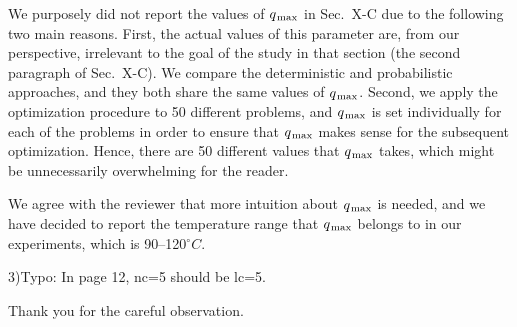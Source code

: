 \begin{authors}
We purposely did not report the values of $q_{\text{\kern0.1emmax}}$ in Sec.~X-C due to the
following two main reasons. First, the actual values of this parameter are,
from our perspective, irrelevant to the goal of the study in that section
(the second paragraph of Sec.~X-C). We compare the deterministic and
probabilistic approaches, and they both share the same values of $q_{\text{\kern0.1emmax}}$.
Second, we apply the optimization procedure to 50 different problems, and
$q_{\text{\kern0.1emmax}}$ is set individually for each of the problems in order to ensure
that $q_{\text{\kern0.1emmax}}$ makes sense for the subsequent optimization. Hence, there
are 50 different values that $q_{\text{\kern0.1emmax}}$ takes, which might be unnecessarily
overwhelming for the reader.

We agree with the reviewer that more intuition about $q_{\text{\kern0.1emmax}}$ is needed,
and we have decided to report the temperature range that $q_{\text{\kern0.1emmax}}$ belongs
to in our experiments, which is 90--120${}^\circ{}C$.

\begin{actions}
\end{actions}
\end{authors}

\begin{reviewer}
3)Typo: In page 12, nc=5 should be lc=5.
\end{reviewer}

\begin{authors}
  Thank you for the careful observation.

\begin{actions}
\end{actions}
\end{authors}
